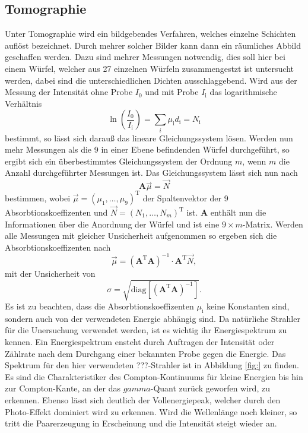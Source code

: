 \subsection{Tomographie}
\label{sec:Tomo}
Unter Tomographie wird ein bildgebendes Verfahren, welches einzelne Schichten auflöst bezeichnet. Durch mehrer solcher Bilder kann dann ein räumliches 
Abbild geschaffen werden. Dazu sind mehrer Messungen notwendig, dies soll hier bei einem 
Würfel, welcher aus \num{27} einzelnen Würfeln zusammengestzt ist untersucht werden, dabei sind die unterschiedlichen Dichten ausschlaggebend.
Wird aus der Messung der Intensität ohne Probe $I_0$ und mit Probe $I_\text{i}$ das logarithmische Verhältnis
\begin{equation}
    \label{eqn:Verhältnis}
    \ln\left(\frac{I_0}{I_\text{i}}\right) = \sum_i \mu_\text{i} d_\text{i} = N_\text{i}
\end{equation}
bestimmt, so lässt sich darauß das lineare Gleichungssystem lösen. Werden nun mehr Messungen als die \num{9} in einer Ebene befindenden Würfel durchgeführt, 
so ergibt sich ein überbestimmtes Gleichungssystem der Ordnung $m$, wenn $m$ die Anzahl durchgeführter Messungen ist.
Das Gleichungssystem lässt sich nun nach
\begin{equation}
    \label{eqn:Gleichungssystem}
    \textbf{A} \vec{\mu} = \vec{N}
\end{equation}
bestimmen, wobei $\vec{\mu} = (\mu_1, \ldots,\mu_9)^\text{T}$ der Spaltenvektor der \num{9} Absorbtionskoeffizenten und $\vec{N} = (N_1, \ldots,N_m)^\text{T}$ ist. 
\textbf{A} enthält nun die Informationen über die Anordnung der Würfel und ist eine $9 \times m$-Matrix. Werden alle Messungen mit gleicher Unsicherheit 
aufgenommen so ergeben sich die Absorbtionskoeffizenten nach
\begin{equation}
    \label{eqn:Absorbtionskoeffizenten}
    \vec{\mu} = (\textbf{A}^\text{T} \textbf{A})^{-1} \cdot \textbf{A}^\text{T} \vec{N},
\end{equation}
mit der Unsicherheit von
\begin{equation}
    \label{eqn:Unsicherheit}
    \sigma = \sqrt{\text{diag}[(\textbf{A}^\text{T} \textbf{A})^{-1}]}.
\end{equation}
Es ist zu beachten, dass die Absorbtionskoeffizenten $\mu_\text{i}$ keine Konstanten sind, sondern auch von der verwendeten Energie abhängig sind. 
Da natürliche Strahler für die Unersuchung verwendet werden, ist es wichtig ihr Energiespektrum zu kennen. Ein Energiespektrum ensteht durch Auftragen der 
Intensität oder Zählrate nach dem Durchgang einer bekannten Probe gegen die Energie. Das Spektrum für den hier verwendeten ???-Strahler ist in Abbildung \ref{fig:} zu finden.
Es sind die Charakteristiker des Compton-Kontinuums für kleine Energien bis hin zur Compton-Kante, an der das $gamma$-Quant zurück geworfen wird, zu erkennen. 
Ebenso lässt sich deutlich der Vollenergiepeak, welcher durch den Photo-Effekt dominiert wird zu erkennen. Wird die Wellenlänge noch kleiner, so tritt die Paarerzeugung
in Erscheinung und die Intensität steigt wieder an.

